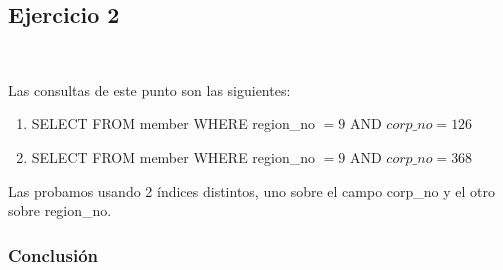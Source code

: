 \subsection{Ejercicio 2}\

Las consultas de este punto son las siguientes:

\begin{enumerate}[label=(\alph*)]
\item{SELECT \* FROM member WHERE region\_no $= 9$ AND $corp\_no = 126$}

\item{SELECT \* FROM member WHERE region\_no $= 9$ AND $corp\_no = 368$}

\end{enumerate}

Las probamos usando 2 índices distintos, uno sobre el campo corp\_no y el otro sobre region\_no.





	
			
			
\subsubsection{Conclusión}

